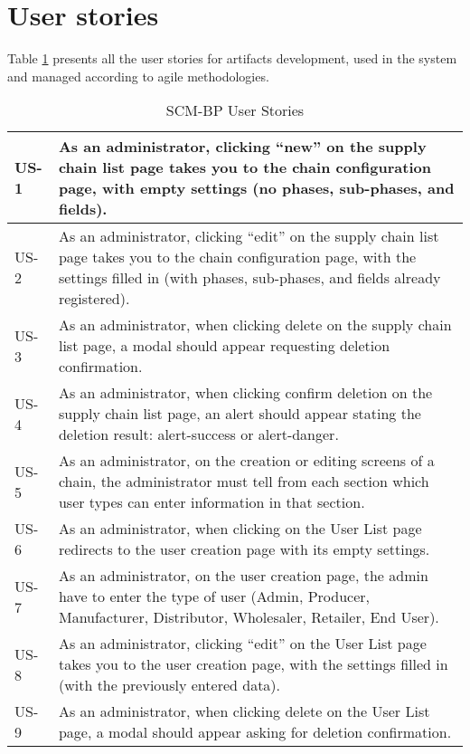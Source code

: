 \section{User stories}{} %

Table \ref{table:userStories} presents all the user stories for artifacts development, used in the system and managed according to agile methodologies.

\begin{table}[H]
\caption{\ac{SCM-BP} User Stories}
\label{table:userStories}
    \begin{tabular}{|l|p{13.5cm}|}
    \hline 
    US-1  & As an administrator, clicking “new” on the supply chain list page takes you to the chain configuration page, with empty settings (no phases, sub-phases, and fields).\\
    \hline 
    US-2  & As an administrator, clicking “edit” on the supply chain list page takes you to the chain configuration page, with the settings filled in (with phases, sub-phases, and fields already registered). \\
    \hline
    US-3  & As an administrator, when clicking delete on the supply chain list page, a modal should appear requesting deletion confirmation.\\
    \hline
    US-4  & As an administrator, when clicking  confirm deletion on the supply chain list page, an alert should appear stating the deletion result: alert-success or alert-danger.\\
    \hline
    US-5  & As an administrator, on the creation or editing screens of a chain, the administrator must tell from each section which user types can enter information in that section.\\
    \hline
    US-6  & As an administrator, when clicking on the User List page redirects to the user creation page with its empty settings.\\
    \hline
    US-7  & As an administrator, on the user creation page, the admin have to enter the type of user (Admin, Producer, Manufacturer, Distributor, Wholesaler, Retailer, End User).\\
    \hline
    US-8  & As an administrator, clicking “edit” on the User List page takes you to the user creation page, with the settings filled in (with the previously entered data).\\
    \hline
    US-9  & As an administrator, when clicking delete on the User List page, a modal should appear asking for deletion confirmation.\\

\end{tabular}
\end{table}
